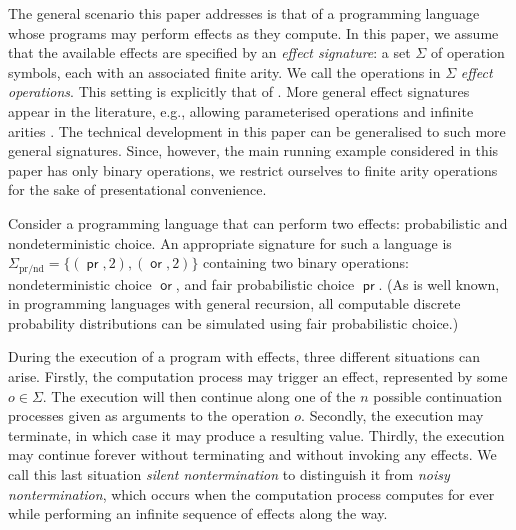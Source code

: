 \documentclass[a4paper,UKenglish]{lipics-v2018}
\newcommand{\prEff}{\operatorname{\textsf{pr}}}
\newcommand{\orEff}{\operatorname{\textsf{or}}}
\newcommand{\prnd}{\text{pr/nd}}
\theoremstyle{plain}
\begin{document}
The general scenario this paper addresses is that of a programming language whose programs may perform effects as they compute. In this paper, we assume that the available effects are  specified 
by  an \emph{effect signature}: a set $\Sigma$ of operation symbols, each with an associated finite arity. We call the operations in $\Sigma$ \emph{effect operations}. This setting is explicitly that of \cite{plotkin2001adequacy}.
More general effect signatures appear in the literature, e.g., allowing parameterised operations and infinite arities
\cite{gom,StatonInstances}. The technical development in this paper can be generalised to such
more general signatures. Since, however, the main running example considered in this paper has only binary operations, we restrict ourselves to finite arity operations 
for the sake of presentational convenience. %
\begin{example}
\label{example:prnd}
    Consider a programming language that can perform two effects: probabilistic and nondeterministic choice.
    An appropriate signature for such a language is 
    $\Sigma_{\prnd} = \{ (\prEff,2), (\orEff,2) \}$ containing two binary operations:
    nondeterministic choice $\orEff$, 
    and fair probabilistic choice $\prEff$. (As is well known, in programming languages with general recursion, all computable discrete probability distributions can be 
     simulated using fair probabilistic choice.)
 \end{example}

During the execution of a program with effects, three different situations can arise. Firstly, the computation process may
trigger an effect, represented by some $o \in \Sigma$. The execution will then continue along one of the $n$ possible continuation processes given as arguments to the operation $o$. Secondly, the execution may terminate, 
in which case it may produce a resulting value. 
Thirdly, the execution may continue forever without terminating and without invoking any effects. We call this last situation
 \emph{silent nontermination} to distinguish it from \emph{noisy nontermination}, which occurs
 when the computation process computes for ever while performing an infinite sequence of effects along the way.
\end{document}
